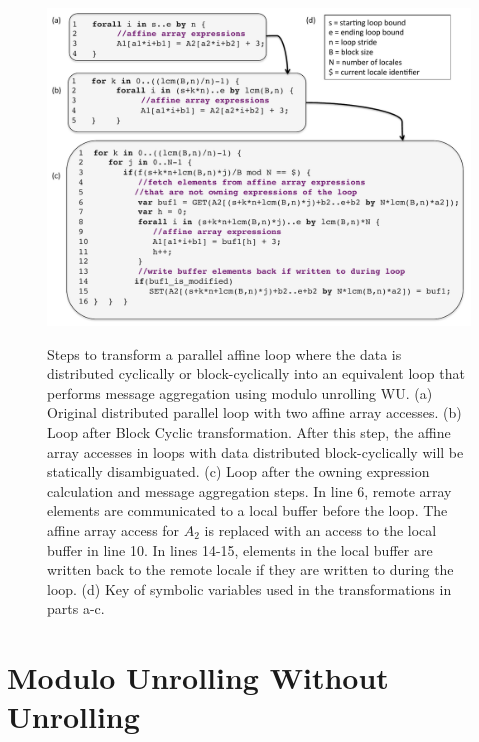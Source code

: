 \begin{figure}
\begin{center}
\includegraphics[width=\linewidth]{./Figures/transformations}
\renewcommand{\baselinestretch}{1}
\small\normalsize
\begin{quote}
\caption[Series of transformations to perform modulo unrolling WU]{Steps to transform a parallel affine loop where the data is distributed cyclically or block-cyclically into an equivalent loop that performs message aggregation using modulo unrolling WU. (a) Original distributed parallel loop with two affine array accesses. (b) Loop after Block Cyclic transformation. After this step, the affine array accesses in loops with data distributed block-cyclically will be statically disambiguated. (c) Loop after the owning expression calculation and message aggregation steps. In line 6, remote array elements are communicated to a local buffer before the loop. The affine array access for $A_{2}$ is replaced with an access to the local buffer in line 10. In lines 14-15, elements in the local buffer are written back to the remote locale if they are written to during the loop. (d) Key of symbolic variables used in the transformations in parts a-c. \label{transformations}}
\end{quote}
\end{center}
\end{figure}

\section{Modulo Unrolling Without Unrolling}\label{sec:modulo_unrolling_without_unrolling}

